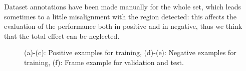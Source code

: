 \documentclass[a4paper,letterpaper, 11pt, onecolumn]{article} %
\begin{document}
Dataset annotations have been made manually for the whole set, which leads sometimes to a little misalignment with the region detected: this affects the evaluation of the performance both in positive and in negative, thus we think that the total effect can be neglected.
\\
\begin{figure}[h!]
\centering
{}

\caption{(a)-(c): Positive examples for training, (d)-(e): Negative examples for training, (f): Frame example for validation and test.}
\label{fig:dataset}
\end{figure}
\\
\end{document}
